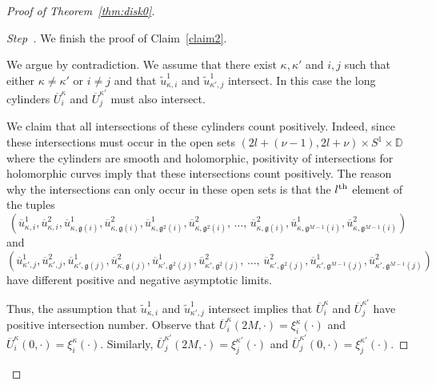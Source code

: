 \documentclass[AHL,Unicode,longabstracts,published]{cedram}
\newcommand{\D}{\mathbb{D}}
\newcommand{\fkg}{\mathfrak{g}}
\newcounter{claim}
\newcounter{stepcount}
\newenvironment{step}{\refstepcounter{stepcount}\begin{proof}[Step~\thestepcount]}{\let\qed\relax\end{proof}}
\begin{document}
\begin{proof}[Proof of Theorem~\ref{thm:disk0}]
\begin{step}\label{step4}
We finish the proof of Claim~\ref{claim2}.

We argue by contradiction. We assume that there exist $\kappa,\kappa'$ and $i,j$ such that either $\kappa \neq \kappa'$ or $i \neq j$ and that $\widetilde{u}^1_{\kappa,i}$ and $\widetilde{u}^1_{\kappa',j}$ intersect. In this case the long cylinders $\overline{U}^\kappa_i$ and $\overline{U}^{\kappa'}_j$ must also intersect.

We claim that all intersections of these cylinders count positively. Indeed, since these intersections must occur in the open sets $(2l + (\nu-1),2l + \nu) \times S^1 \times \D$ where the cylinders are smooth and holomorphic, positivity of intersections for holomorphic curves imply that these intersections count positively. The reason why the intersections can only occur in these open sets is that the $l^{\rm th}$ element of the tuples
\[
\left(\overline{u}^1_{\kappa,i},\overline{u}^2_{\kappa,i}, \overline{u}^1_{\kappa,\fkg(i)},\overline{u}^2_{\kappa,\fkg(i)},\overline{u}^1_{\kappa,\fkg^2(i)},\overline{u}^2_{\kappa,\fkg^2(i)},\,\ldots,\,\overline{u}^2_{\kappa,\fkg(i)},\overline{u}^1_{\kappa,\fkg^{M-1}(i)},\overline{u}^2_{\kappa,\fkg^{M-1}(i)}\right)
\]
and
\[
\left(\overline{u}^1_{\kappa',j},\overline{u}^2_{\kappa',j}, \overline{u}^1_{\kappa',\fkg(j)},\overline{u}^2_{\kappa,\fkg(j)},\overline{u}^1_{\kappa',\fkg^2(j)},\overline{u}^2_{\kappa',\fkg^2(j)},\,\ldots,\,\overline{u}^2_{\kappa',\fkg^2(j)},\overline{u}^1_{\kappa',\fkg^{M-1}(j)},\overline{u}^2_{\kappa',\fkg^{M-1}(j)}\right)
\]
have different positive and negative asymptotic limits.

Thus, the assumption that $\widetilde{u}^1_{\kappa,i}$ and $\widetilde{u}^1_{\kappa',j}$ intersect implies that $\overline{U}^\kappa_i$ and $\overline{U}^{\kappa'}_j$ have positive intersection number. Observe that $\overline{U}^\kappa_i(2M,\cdot)= \xi^\kappa_i(\cdot)$ and $\overline{U}^\kappa_i(0,\cdot)= \xi^\kappa_i(\cdot)$. Similarly, $\overline{U}^{\kappa'}_j(2M,\cdot)= \xi^{\kappa'}_j(\cdot)$ and $\overline{U}^{\kappa'}_j(0,\cdot)= \xi^{\kappa'}_j(\cdot)$.


\end{step}
\end{proof}
\end{document}
